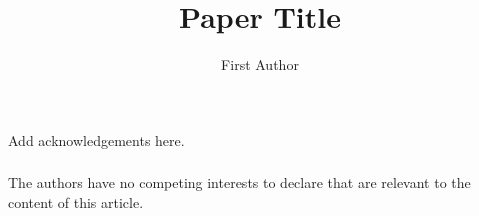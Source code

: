 \documentclass[runningheads]{llncs}
\begin{document}
\title{Paper Title}

\author{First Author}

\maketitle

\begin{abstract}

\end{abstract}


% 
% 
% 
% 
% 

\begin{credits}
\subsubsection{\ackname} Add acknowledgements here.

\subsubsection{\discintname}
The authors have no competing interests to declare that are relevant to the content of this article.
\end{credits}



\end{document}
